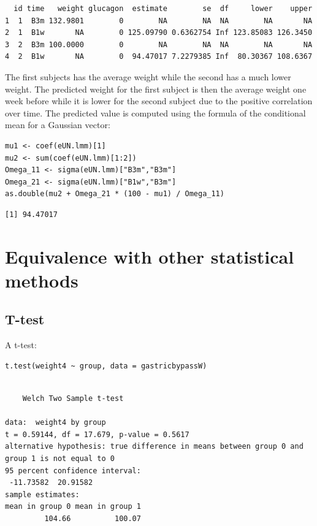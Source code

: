 \documentclass[12pt]{article}
\begin{document}
\begin{verbatim}
  id time   weight glucagon  estimate        se  df     lower    upper
1  1  B3m 132.9801        0        NA        NA  NA        NA       NA
2  1  B1w       NA        0 125.09790 0.6362754 Inf 123.85083 126.3450
3  2  B3m 100.0000        0        NA        NA  NA        NA       NA
4  2  B1w       NA        0  94.47017 7.2279385 Inf  80.30367 108.6367
\end{verbatim}


The first subjects has the average weight while the second has a much
  lower weight. The predicted weight for the first subject is then the
  average weight one week before while it is lower for the second
  subject due to the positive correlation over time. The predicted
  value is computed using the formula of the conditional mean for a
  Gaussian vector:
\lstset{language=r,label= ,caption= ,captionpos=b,numbers=none}
\begin{lstlisting}
mu1 <- coef(eUN.lmm)[1]
mu2 <- sum(coef(eUN.lmm)[1:2])
Omega_11 <- sigma(eUN.lmm)["B3m","B3m"]
Omega_21 <- sigma(eUN.lmm)["B1w","B3m"]
as.double(mu2 + Omega_21 * (100 - mu1) / Omega_11)
\end{lstlisting}

\begin{verbatim}
[1] 94.47017
\end{verbatim}



\clearpage

\section{Equivalence with other statistical methods}
\label{sec:org7a61f29}
\subsection{T-test}
\label{sec:orgdc4b6b1}
A t-test:
\lstset{language=r,label= ,caption= ,captionpos=b,numbers=none}
\begin{lstlisting}
t.test(weight4 ~ group, data = gastricbypassW)
\end{lstlisting}

\begin{verbatim}

	Welch Two Sample t-test

data:  weight4 by group
t = 0.59144, df = 17.679, p-value = 0.5617
alternative hypothesis: true difference in means between group 0 and group 1 is not equal to 0
95 percent confidence interval:
 -11.73582  20.91582
sample estimates:
mean in group 0 mean in group 1 
         104.66          100.07
\end{verbatim}
\end{document}
